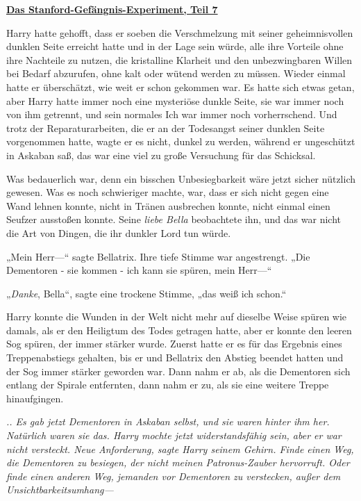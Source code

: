 

\hypertarget{das-stanford-gefuxe4ngnis-experiment-teil-7}{%

\textbf{\uline{Das Stanford-Gefängnis-Experiment, Teil 7}}

Harry hatte gehofft, dass er soeben die Verschmelzung mit seiner geheimnisvollen dunklen Seite erreicht hatte und in der Lage sein würde, alle ihre Vorteile ohne ihre Nachteile zu nutzen, die kristalline Klarheit und den unbezwingbaren Willen bei Bedarf abzurufen, ohne kalt oder wütend werden zu müssen. Wieder einmal hatte er überschätzt, wie weit er schon gekommen war. Es hatte sich etwas getan, aber Harry hatte immer noch eine mysteriöse dunkle Seite, sie war immer noch von ihm getrennt, und sein normales Ich war immer noch vorherrschend. Und trotz der Reparaturarbeiten, die er an der Todesangst seiner dunklen Seite vorgenommen hatte, wagte er es nicht, dunkel zu werden, während er ungeschützt in Askaban saß, das war eine viel zu große Versuchung für das Schicksal.

Was bedauerlich war, denn ein bisschen Unbesiegbarkeit wäre jetzt sicher nützlich gewesen. Was es noch schwieriger machte, war, dass er sich nicht gegen eine Wand lehnen konnte, nicht in Tränen ausbrechen konnte, nicht einmal einen Seufzer ausstoßen konnte. Seine \emph{liebe Bella} beobachtete ihn, und das war nicht die Art von Dingen, die ihr dunkler Lord tun würde.

„Mein Herr—“ sagte Bellatrix. Ihre tiefe Stimme war angestrengt. „Die Dementoren - sie kommen - ich kann sie spüren, mein Herr—“

„\emph{Danke}, Bella“, sagte eine trockene Stimme, „das weiß ich schon.“

Harry konnte die Wunden in der Welt nicht mehr auf dieselbe Weise spüren wie damals, als er den Heiligtum des Todes getragen hatte, aber er konnte den leeren Sog spüren, der immer stärker wurde. Zuerst hatte er es für das Ergebnis eines Treppenabstiegs gehalten, bis er und Bellatrix den Abstieg beendet hatten und der Sog immer stärker geworden war. Dann nahm er ab, als die Dementoren sich entlang der Spirale entfernten, dann nahm er zu, als sie eine weitere Treppe hinaufgingen.

\emph{.. Es gab jetzt Dementoren in Askaban selbst, und sie waren hinter ihm her. Natürlich waren sie das. Harry mochte jetzt widerstandsfähig sein, aber er war nicht versteckt. Neue Anforderung, sagte Harry seinem Gehirn. Finde einen Weg, die Dementoren zu besiegen, der nicht meinen Patronus-Zauber hervorruft. Oder finde einen anderen Weg, jemanden vor Dementoren zu verstecken, außer dem Unsichtbarkeitsumhang—}

}
